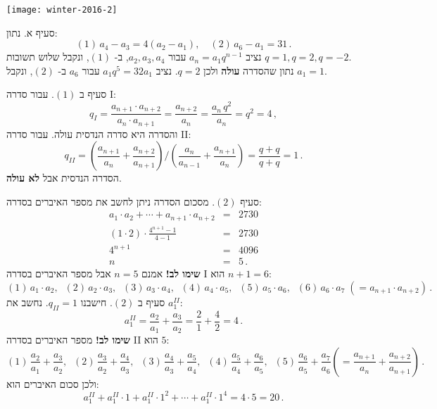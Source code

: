\newpage

\textbf{}

\begin{center}
\texttt{[image: winter-2016-2]}
\end{center}

סעיף א. נתון:
\[
(1)\, a_4-a_3 = 4 (a_2-a_1),\quad (2)\, a_6 - a_1 = 31\,.
\]
נציב
$a_n=a_1q^{n-1}$ 
עבור
$a_2, a_3, a_4$,
ב-%
$(1)$,
ונקבל שלוש תשובות
$q=1,q=2,q=-2$.\\
נתון שהסדרה 
\textbf{עולה}
ולכן
$q=2$.
נציב 
$a_1q^5=32 a_1$
עבור
$a_6$
ב-%
$(2)$,
ונקבל
$a_1=1$.

סעיף ב 
$(1)$.
עבור סדרה I:
\[
q_I=\frac{a_{n+1}\cdot a_{n+2}}{a_n\cdot a_{n+1}}=\frac{a_{n+2}}{a_n}=\frac{a_n\,q^2}{a_n}=q^2=4\,,
\]
והסדרה היא סדרה הנדסית עולה. עבור סדרה II:
\[
q_{II}=\left(\frac{a_{n+1}}{a_n} + \frac{a_{n+2}}{a_{n+1}}\right) / \left(\frac{a_{n}}{a_{n-1}} + \frac{a_{n+1}}{a_{n}}\right)=\frac{q+q}{q+q}=1\,.
\]
הסדרה הנדסית אבל
\textbf{לא עולה}.

סעיף
$(2)$.
מסכום הסדרה ניתן לחשב את מספר האיברים בסדרה:
\begin{eqnarray*}
a_1\cdot a_2 + \cdots + a_{n+1} \cdot a_{n+2} &=& 2730\\
(1\cdot 2)\cdot \frac{4^{n+1}-1}{4-1}&=&2730\\
4^{n+1}&=&4096\\
n&=&5\,.
\end{eqnarray*}
\textbf{שימו לב!}
אמנם
$n=5$
אבל מספר האיברים בסדרה I הוא 
$n+1=6$:
\[
(1)\, a_1\cdot a_2,\;\; (2)\,a_2\cdot a_3,\;\;(3)\, a_3\cdot a_4,\;\; (4)\,a_4\cdot a_5,\;\; (5)\,a_5\cdot a_6,\;\; (6)\,a_6\cdot a_7 \;(= a_{n+1}\cdot a_{n+2})\,.
\]
סעיף ב
$(2)$.
חישבנו
$q_{II}=1$.
נחשב את
$a_1^{II}$:
\[
a_1^{II}=\frac{a_{2}}{a_1} + \frac{a_{3}}{a_{2}}=\frac{2}{1}+\frac{4}{2}=4\,.
\]
\textbf{שימו לב!}
מספר האיברים בסדרה II הוא 
$5$:
\[
(1)\,\frac{a_2}{a_1}+\frac{a_3}{a_2},\;\;
(2)\,\frac{a_3}{a_2}+\frac{a_4}{a_3},\;\;
(3)\,\frac{a_4}{a_3}+\frac{a_5}{a_4},\;\;
(4)\,\frac{a_5}{a_4}+\frac{a_6}{a_5},\;\;
(5)\,\frac{a_6}{a_5}+\frac{a_7}{a_6} \left(= \frac{a_{n+1}}{a_n}+\frac{a_{n+2}}{a_{n+1}}\right)\,.
\]
ולכן סכום האיברים הוא:
\[
a_1^{II}+a_1^{II}\cdot 1 + a_1^{II}\cdot 1^2 + \cdots + a_1^{II}\cdot 1^4 = 4\cdot 5=20\,.
\]
\vspace*{-6ex}
\bigskip

\textbf{}

